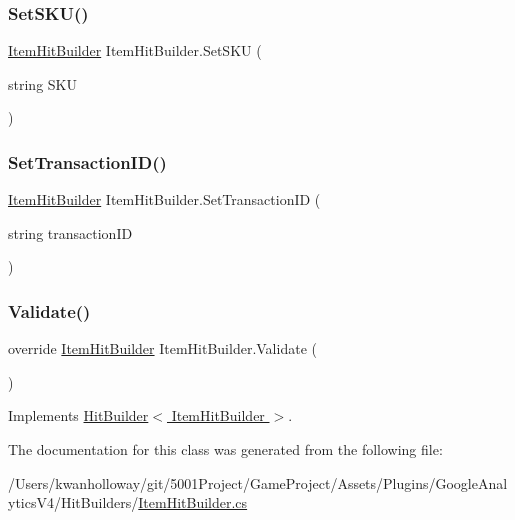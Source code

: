 \subsubsection{\texorpdfstring{Set\+S\+K\+U()}{SetSKU()}}
{\footnotesize\ttfamily \hyperlink{class_item_hit_builder}{Item\+Hit\+Builder} Item\+Hit\+Builder.\+Set\+S\+KU (\begin{DoxyParamCaption}\item[{string}]{S\+KU }\end{DoxyParamCaption})}

\mbox{\label{class_item_hit_builder_ab6680f6f137e4121aa34d390514903ca}} 
\subsubsection{\texorpdfstring{Set\+Transaction\+I\+D()}{SetTransactionID()}}
{\footnotesize\ttfamily \hyperlink{class_item_hit_builder}{Item\+Hit\+Builder} Item\+Hit\+Builder.\+Set\+Transaction\+ID (\begin{DoxyParamCaption}\item[{string}]{transaction\+ID }\end{DoxyParamCaption})}

\mbox{\label{class_item_hit_builder_acaaf2b68e53e2c9275f2e9020f97ddcf}} 
\subsubsection{\texorpdfstring{Validate()}{Validate()}}
{\footnotesize\ttfamily override \hyperlink{class_item_hit_builder}{Item\+Hit\+Builder} Item\+Hit\+Builder.\+Validate (\begin{DoxyParamCaption}{ }\end{DoxyParamCaption})\hspace{0.3cm}{\ttfamily [virtual]}}



Implements \hyperlink{class_hit_builder_a0f4833828bd530bb057c9ca359584bce}{Hit\+Builder$<$ Item\+Hit\+Builder $>$}.



The documentation for this class was generated from the following file\+:\begin{DoxyCompactItemize}
\item 
/\+Users/kwanholloway/git/5001\+Project/\+Game\+Project/\+Assets/\+Plugins/\+Google\+Analytics\+V4/\+Hit\+Builders/\hyperlink{_item_hit_builder_8cs}{Item\+Hit\+Builder.\+cs}\end{DoxyCompactItemize}
